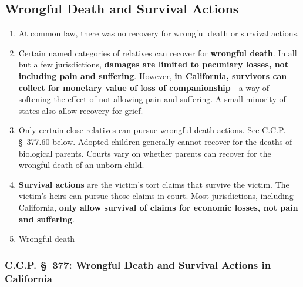 \subsection{Wrongful Death and Survival Actions}

\begin{enumerate}
    \item At common law, there was no recovery for wrongful death or survival 
    actions.
    \item Certain named categories of relatives can recover for 
    \textbf{wrongful death}. In all but a few jurisdictions, \textbf{damages 
    are limited to pecuniary losses, not including pain and suffering}.  
    However, \textbf{in California, survivors can collect for monetary value 
    of loss of companionship}---a way of softening the effect of not allowing 
    pain and suffering. A small minority of states also allow recovery for 
    grief.
    \item Only certain close relatives can pursue wrongful death actions. See 
    C.C.P. \S\ 377.60 below. Adopted children generally cannot recover for the 
    deaths of biological parents. Courts vary on whether parents can recover 
    for the wrongful death of an unborn child.
    \item \textbf{Survival actions} are the victim's tort claims that survive 
    the victim. The victim's heirs can pursue those claims in court. Most 
    jurisdictions, including California, \textbf{only allow survival of claims 
    for economic losses, not pain and suffering}.
    \item Wrongful death \end{enumerate}

\subsubsection{C.C.P. \S\ 377: Wrongful Death and Survival Actions in 
California}

